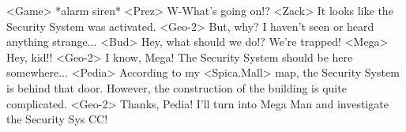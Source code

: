 <Game> *alarm siren* 
<Prez> W-What's going on!? 
<Zack> It looks like the Security System was activated. 
<Geo-2> But, why? I haven't seen or heard anything strange... 
<Bud> Hey, what should we do!? We're trapped! 
<Mega> Hey, kid!! 
<Geo-2> I know, Mega! 
The Security System should be here somewhere... 
<Pedia> According to my <Spica.Mall> map, the Security System is behind that door. 
However, the construction of the building is quite complicated. 
<Geo-2> Thanks, Pedia! 
I'll turn into Mega Man and investigate the Security Sys CC! 
